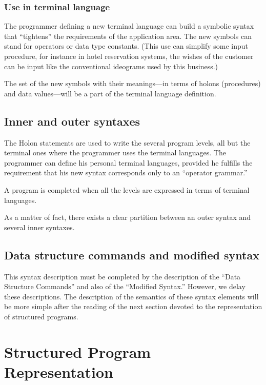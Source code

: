 \documentclass[openany,nobib]{tufte-book}
\begin{document}
\subsection{Use in terminal language}

The programmer defining a new terminal language can build a symbolic syntax
that ``tightens'' the requirements of the application area. The new symbols can
stand for operators or data type constants. (This use can simplify some input
procedure, for instance in hotel reservation systems, the wishes of the
customer can be input like the conventional ideograms used by this business.)

The set of the new symbols with their meanings---in terms of holons
(procedures) and data values---will be a part of the terminal language
definition.

\section{Inner and outer syntaxes}

The Holon statements are used to write the several program levels, all but the
terminal ones where the programmer uses the terminal languages. The programmer
can define his personal terminal languages, provided he fulfills the
requirement that his new syntax corresponds only to an ``operator grammar.''

A program is completed when all the levels are expressed in terms of terminal
languages.

As a matter of fact, there exists a clear partition between an outer syntax and
several inner syntaxes.\autocite{wilkes1968outer}

\section{Data structure commands and modified syntax}

This syntax description must be completed by the description of the ``Data
Structure Commands'' and also of the ``Modified Syntax.'' However, we delay
these descriptions. The description of the semantics of these syntax elements
will be more simple after the reading of the next section devoted to the
representation of structured programs.

\chapter{Structured Program Representation}
\end{document}
